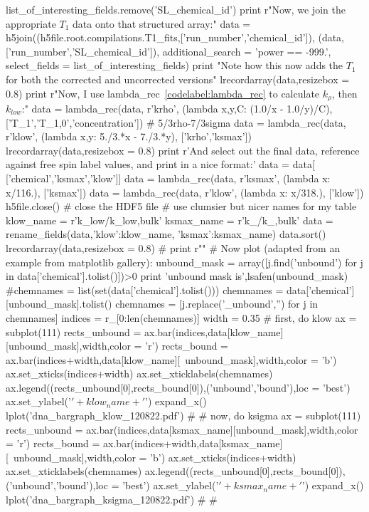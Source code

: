 \begin{python}
list_of_interesting_fields.remove('SL_chemical_id')
print r"Now, we join the appropriate $T_1$ data onto that structured array:"
data = h5join((h5file.root.compilations.T1_fits,['run_number','chemical_id']),
    (data,['run_number','SL_chemical_id']),
    additional_search = 'power == -999.',
    select_fields = list_of_interesting_fields)
print "Note how this now adds the $T_1$ for both the corrected and uncorrected versions"
lrecordarray(data,resizebox = 0.8)
print r"Now, I use lambda\_rec~\ref{codelabel:lambda_rec} to calculate $k_\rho$, then $k_{low}$:"
data = lambda_rec(data,
    r'krho',
    (lambda x,y,C: (1.0/x - 1.0/y)/C),
    ['T_1','T_{1,0}','concentration'])
# 5/3rho-7/3sigma
data = lambda_rec(data,
    r'klow',
    (lambda x,y: 5./3.*x - 7./3.*y),
    ['krho','ksmax'])
lrecordarray(data,resizebox = 0.8)
print r'And select out the final data, reference against free spin label values, and print in a nice format:'
data = data[ ['chemical','ksmax','klow']]
data = lambda_rec(data,
    r'ksmax',
    (lambda x: x/116.),
    ['ksmax'])
data = lambda_rec(data,
    r'klow',
    (lambda x: x/318.),
    ['klow'])
h5file.close() # close the HDF5 file
#{{{ use clumsier but nicer names for my table
klow_name = r'k_{low}/k_{low,bulk}'
ksmax_name = r'k_{\sigma}/k_{\sigma,bulk}'
data = rename_fields(data,{'klow':klow_name,
                            'ksmax':ksmax_name})
data.sort()
lrecordarray(data,resizebox = 0.8)
#}}}
print r"{\color{red}{\bf This particular example is having trouble because of how I'm trying to sort the data $\Rightarrow$ what I used to have only worked when there was just one piece of data per chemical, but since I fixed the code, the repeats are also included}}"
#{{{ Now plot (adapted from an example from matplotlib gallery):
unbound_mask = array([j.find('unbound') for j in data['chemical'].tolist()])>0
print 'unbound mask is',lsafen(unbound_mask)
#chemnames = list(set(data['chemical'].tolist()))
chemnames = data['chemical'][unbound_mask].tolist()
chemnames = [j.replace('_unbound','') for j in chemnames]
indices = r_[0:len(chemnames)]
width = 0.35
#{{{ first, do klow
ax = subplot(111)
rects_unbound = ax.bar(indices,data[klow_name][unbound_mask],width,color = 'r')
rects_bound = ax.bar(indices+width,data[klow_name][~unbound_mask],width,color = 'b')
ax.set_xticks(indices+width)
ax.set_xticklabels(chemnames)
ax.legend((rects_unbound[0],rects_bound[0]),('unbound','bound'),loc = 'best')
ax.set_ylabel('$'+klow_name+'$')
expand_x()
lplot('dna_bargraph_klow_120822.pdf')
#}}}
#{{{ now, do ksigma
ax = subplot(111)
rects_unbound = ax.bar(indices,data[ksmax_name][unbound_mask],width,color = 'r')
rects_bound = ax.bar(indices+width,data[ksmax_name][~unbound_mask],width,color = 'b')
ax.set_xticks(indices+width)
ax.set_xticklabels(chemnames)
ax.legend((rects_unbound[0],rects_bound[0]),('unbound','bound'),loc = 'best')
ax.set_ylabel('$'+ksmax_name+'$')
expand_x()
lplot('dna_bargraph_ksigma_120822.pdf')
#}}}
#}}}
\end{python}


